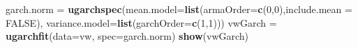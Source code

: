 \documentclass[
]{article}
\newenvironment{Shaded}{\begin{snugshade}}{\end{snugshade}}
\newcommand{\AttributeTok}[1]{\textcolor[rgb]{0.13,0.29,0.53}{#1}}
\newcommand{\ConstantTok}[1]{\textcolor[rgb]{0.56,0.35,0.01}{#1}}
\newcommand{\DecValTok}[1]{\textcolor[rgb]{0.00,0.00,0.81}{#1}}
\newcommand{\FunctionTok}[1]{\textcolor[rgb]{0.13,0.29,0.53}{\textbf{#1}}}
\newcommand{\NormalTok}[1]{#1}
\newcommand{\OtherTok}[1]{\textcolor[rgb]{0.56,0.35,0.01}{#1}}
\begin{document}
\begin{Shaded}
\begin{Highlighting}[]
\NormalTok{garch.norm }\OtherTok{=} \FunctionTok{ugarchspec}\NormalTok{(}\AttributeTok{mean.model=}\FunctionTok{list}\NormalTok{(}\AttributeTok{armaOrder=}\FunctionTok{c}\NormalTok{(}\DecValTok{0}\NormalTok{,}\DecValTok{0}\NormalTok{),}\AttributeTok{include.mean =} \ConstantTok{FALSE}\NormalTok{),}
\AttributeTok{variance.model=}\FunctionTok{list}\NormalTok{(}\AttributeTok{garchOrder=}\FunctionTok{c}\NormalTok{(}\DecValTok{1}\NormalTok{,}\DecValTok{1}\NormalTok{)))}
\NormalTok{vwGarch }\OtherTok{=} \FunctionTok{ugarchfit}\NormalTok{(}\AttributeTok{data=}\NormalTok{vw, }\AttributeTok{spec=}\NormalTok{garch.norm)}
\FunctionTok{show}\NormalTok{(vwGarch)}
\end{Highlighting}
\end{Shaded}
\end{document}
